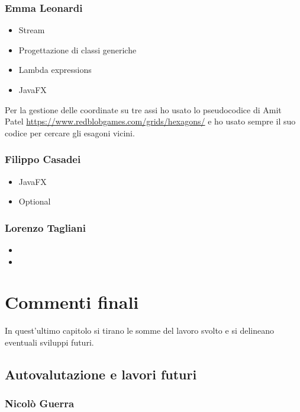 \documentclass[a4paper,12pt]{report}
\begin{document}
\subsection{Emma Leonardi}
\begin{itemize}
	\item Stream
	\item Progettazione di classi generiche
	\item Lambda expressions
	\item JavaFX
\end{itemize}

Per la gestione delle coordinate su tre assi ho usato lo pseudocodice di Amit Patel \url{https://www.redblobgames.com/grids/hexagons/} e ho usato sempre il suo codice per cercare gli esagoni vicini.

\subsection{Filippo Casadei}
\begin{itemize}
	\item JavaFX
	\item Optional
\end{itemize}

\subsection{Lorenzo Tagliani}
\begin{itemize}
	\item 
	\item 
\end{itemize}

\chapter{Commenti finali}

In quest'ultimo capitolo si tirano le somme del lavoro svolto e si delineano eventuali sviluppi
futuri.

\section{Autovalutazione e lavori futuri}

\subsection{Nicolò Guerra}
\end{document}
